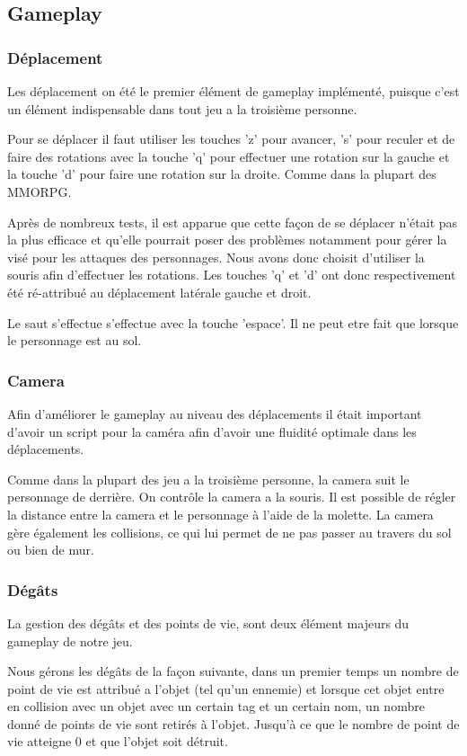 \documentclass[a4paper, 12pt]{article}
\begin{document}
	\subsection{Gameplay}
		\subsubsection{Déplacement}
		Les déplacement on été le premier élément de gameplay implémenté, puisque c'est un élément indispensable dans tout jeu a la troisième personne.
		\par Pour se déplacer il faut utiliser les touches 'z' pour avancer, 's' pour reculer et de faire des rotations avec la touche 'q' pour effectuer une rotation sur la gauche et la touche 'd' pour faire une rotation sur la droite. Comme dans la plupart des MMORPG.
		\par Après de nombreux tests, il est apparue que cette façon de se déplacer n'était pas la plus efficace et qu'elle pourrait poser des problèmes notamment pour gérer la visé pour les attaques des personnages. Nous avons donc choisit d'utiliser la souris afin d'effectuer les rotations. Les touches 'q' et 'd' ont donc respectivement été ré-attribué au déplacement latérale gauche et droit.
		\par Le saut s'effectue s'effectue avec la touche 'espace'. Il ne peut etre fait que lorsque le personnage est au sol.  
		\subsubsection{Camera}
		Afin d'améliorer le gameplay au niveau des déplacements il était important d'avoir un script pour la caméra afin d'avoir une fluidité optimale dans les déplacements.
		\par Comme dans la plupart des jeu a la troisième personne, la camera suit le personnage de derrière. On contrôle la camera a la souris. Il est possible de régler la distance entre la camera et le personnage à l'aide de la molette. La camera gère également les collisions, ce qui lui permet de ne pas passer au travers du sol ou bien de mur.
		\subsubsection{Dégâts}
		La gestion des dégâts et des points de vie, sont deux élément majeurs du gameplay de notre jeu.
		\par Nous gérons les dégâts de la façon suivante, dans un premier temps un nombre de point de vie est attribué a l'objet (tel qu'un ennemie) et lorsque cet objet entre en collision avec un objet avec un certain tag et un certain nom, un nombre donné de points de vie sont retirés à l'objet. Jusqu'à ce que le nombre de point de vie atteigne 0 et que l'objet soit détruit.
\end{document}
